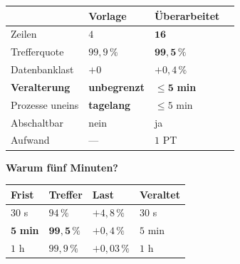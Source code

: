 \begin{merksatz}
\begin{center}
{\small
\renewcommand{\arraystretch}{1.45}
\begin{tabular}{@{}P{2.8cm}P{2.0cm}P{2.2cm}P{2.0cm}@{}}
\toprule
& \textbf{Vorlage} & \textbf{Überarbeitet} & \\
\midrule
Zeilen & $4$ & $\mathbf{16}$ & \\
Trefferquote & $99{,}9\,\%$ & $\mathbf{99{,}5\,\%}$ & \\
Datenbanklast & $+0$ & \textcolor{mittel}{$+0{,}4\,\%$} & \\
\textbf{Veralterung} & \textcolor{akzent}{\textbf{unbegrenzt}} & \textcolor{gruen}{$\mathbf{\le 5}$ \textbf{min}} & \\
Prozesse uneins & \textcolor{akzent}{\textbf{tagelang}} & \textcolor{gruen}{$\le 5$ min} & \\
Abschaltbar & \textcolor{akzent}{nein} & \textcolor{gruen}{ja} & \\
Aufwand & --- & $1$ PT & \\
\bottomrule
\end{tabular}}
\end{center}

\begin{center}
\begin{minipage}{0.88\textwidth}
\end{minipage}
\end{center}

\textbf{Warum fünf Minuten?}

\begin{center}
\renewcommand{\arraystretch}{1.45}
\begin{tabular}{@{}P{2.4cm}P{2.2cm}P{2.2cm}P{2.0cm}@{}}
\toprule
\textbf{Frist} & \textbf{Treffer} & \textbf{Last} & \textbf{Veraltet}\\
\midrule
$30$ s & $94\,\%$ & \textcolor{akzent}{$+4{,}8\,\%$} & \textcolor{gruen}{$30$ s}\\
$\mathbf{5}$ \textbf{min} & $\mathbf{99{,}5\,\%}$ & \textcolor{gruen}{$+0{,}4\,\%$} & \textcolor{gruen}{$5$ min}\\
$1$ h & $99{,}9\,\%$ & \textcolor{gruen}{$+0{,}03\,\%$} & \textcolor{akzent}{$1$ h}\\
\bottomrule
\end{tabular}
\end{center}

\begin{center}
\end{center}
\end{merksatz}

